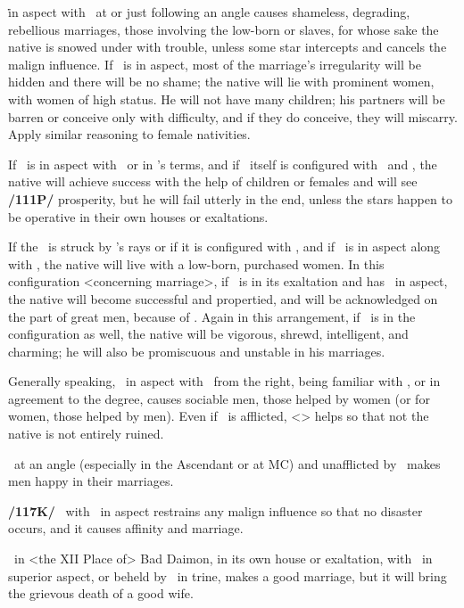 \Saturn\. in aspect with \Venus\, at or just following an angle causes shameless, degrading, rebellious marriages, those involving the low-born or slaves, for whose sake the native is snowed under with trouble, unless some star intercepts and cancels the malign influence. If \Jupiter\, is in aspect, most of the marriage’s irregularity will be hidden and there will be no shame; the native will lie with prominent women, with women of high status. He will not have many children; his partners will be barren or conceive only with difficulty, and if they do conceive, they will miscarry. Apply similar reasoning to female nativities.

If \Saturn\, is in aspect with \Venus\, or in \Venus’s terms, and if \Venus\, itself is configured with \Jupiter\, and \Mars, the native will achieve success with the help of children or females and will see \textbf{/111P/} prosperity, but  he will fail utterly in the end, unless the stars happen to be operative in their own houses or
exaltations. 

If the \Moon\, is struck by \Jupiter’s rays or if it is configured with \Jupiter, and if \Saturn\, is in aspect along with \Jupiter, the native will live with a low-born, purchased women. In this configuration <concerning marriage>, if \Venus\, is in its exaltation and has \Jupiter\, in aspect, the native will become successful and propertied, and will be acknowledged on the part of great men, because of \Venus. Again in this arrangement, if \Mercury\, is in the configuration as well, the native will be vigorous, shrewd, intelligent, and charming; he will also be promiscuous and unstable in his marriages. 

Generally speaking, \Jupiter\, in aspect with \Venus\, from the right, being familiar with \Venus, or in agreement to the degree, causes sociable men, those helped by women (or for women, those helped by men). Even if \Venus\, is afflicted, <\Jupiter> helps so that not the native is not entirely ruined.

\Venus\, at an angle (especially in the Ascendant or at MC) and unafflicted by \Saturn\, makes men happy in their marriages. 

\textbf{/117K/} \Venus\, with \Jupiter\, in aspect restrains any malign influence so that no disaster occurs, and it causes affinity and marriage. 

\Venus\, in <the XII Place of> Bad Daimon, in its own house or exaltation, with \Jupiter\, in superior aspect, or beheld by \Jupiter\, in trine, makes a good marriage, but it will bring the grievous death of a good wife. 

